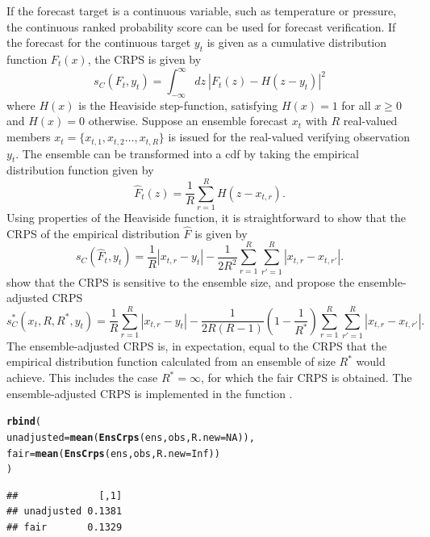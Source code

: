 \documentclass[article]{jss}\usepackage{graphicx, color}
\makeatletter
\newcommand{\hlfunctioncall}[1]{\textcolor[rgb]{0,0.501960784313725,0.752941176470588}{\textbf{#1}}}%
\newenvironment{kframe}{%
 \def\at@end@of@kframe{}%
 \ifinner\ifhmode%
  \def\at@end@of@kframe{\end{minipage}}%
  \begin{minipage}{\columnwidth}%
 \fi\fi%
 \def\FrameCommand##1{\hskip\@totalleftmargin \hskip-\fboxsep
 \colorbox{shadecolor}{##1}\hskip-\fboxsep
     \hskip-\linewidth \hskip-\@totalleftmargin \hskip\columnwidth}%
 \MakeFramed {\advance\hsize-\width
   \@totalleftmargin\z@ \linewidth\hsize
   \@setminipage}}%
 {\par\unskip\endMakeFramed%
 \at@end@of@kframe}
\newenvironment{knitrout}{}{} %
\makeatother
\begin{document}
If the forecast target is a continuous variable, such as temperature or pressure, the continuous ranked probability score \citep{matheson1976scoring} can be used for forecast verification.
If the forecast for the continuous target $y_t$ is given as a cumulative distribution function $F_t(x)$, the CRPS is given by 
%
\begin{equation}
s_{C}(F_t, y_t) = \int_{-\infty}^\infty dz\ \left|F_t(z) - H(z-y_t)\right|^2
\end{equation}
%
where $H(x)$ is the Heaviside step-function, satisfying $H(x)=1$ for all $x\ge 0$ and $H(x)=0$ otherwise.
Suppose an ensemble forecast $x_t$ with $R$ real-valued members $x_t = \{x_{t,1}, x_{t,2} \dots, x_{t,R}\}$ is issued for the real-valued verifying observation $y_t$.
The ensemble can be transformed into a cdf by taking the empirical distribution function given by 
%
\begin{equation}
\hat{F}_t(z) = \frac{1}{R} \sum_{r=1}^{R} H(z - x_{t,r}).
\end{equation}
%
Using properties of the Heaviside function, it is straightforward to show that the CRPS of the empirical distribution $\hat{F}$ is given by
%
\begin{equation}
s_{C}(\hat{F}_t, y_t) = \frac{1}{R}|x_{t,r}-y_t| - \frac{1}{2R^2} \sum_{r=1}^R \sum_{r'=1}^R |x_{t,r}-x_{t,r'}|.
\end{equation}
%
\citet{fricker2013three} show that the CRPS is sensitive to the ensemble size, and propose the ensemble-adjusted CRPS
%
\begin{equation}
s_{C}^*(x_t, R, R^*, y_t) = \frac{1}{R}\sum_{r=1}^R |x_{t,r} - y_t| - \frac{1}{2R(R-1)}\left(1-\frac{1}{R^*}\right) \sum_{r=1}^R\sum_{r'=1}^R |x_{t,r}-x_{t,r'}|.
\end{equation}
%
The ensemble-adjusted CRPS is, in expectation, equal to the CRPS that the empirical distribution function calculated from an ensemble of size $R^*$ would achieve.
This includes the case $R^*=\infty$, for which the fair CRPS is obtained.
The ensemble-adjusted CRPS is implemented in the  function .

\begin{knitrout}
\color{fgcolor}\begin{kframe}
\begin{alltt}
\hlfunctioncall{rbind}(
  unadjusted = \hlfunctioncall{mean}(\hlfunctioncall{EnsCrps}(ens, obs, R.new=NA)), 
  fair       = \hlfunctioncall{mean}(\hlfunctioncall{EnsCrps}(ens, obs, R.new=Inf))
)
\end{alltt}
\begin{verbatim}
##              [,1]
## unadjusted 0.1381
## fair       0.1329
\end{verbatim}
\end{kframe}
\end{knitrout}
\end{document}
